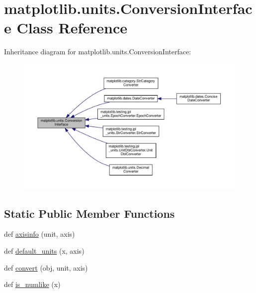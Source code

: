 \hypertarget{classmatplotlib_1_1units_1_1ConversionInterface}{}\section{matplotlib.\+units.\+Conversion\+Interface Class Reference}
\label{classmatplotlib_1_1units_1_1ConversionInterface}


Inheritance diagram for matplotlib.\+units.\+Conversion\+Interface\+:
\nopagebreak
\begin{figure}[H]
\begin{center}
\leavevmode
\includegraphics[width=350pt]{classmatplotlib_1_1units_1_1ConversionInterface__inherit__graph}
\end{center}
\end{figure}
\subsection*{Static Public Member Functions}
\begin{DoxyCompactItemize}
\item 
def \hyperlink{classmatplotlib_1_1units_1_1ConversionInterface_a9b4018c7837e3646e722747d8853b200}{axisinfo} (unit, axis)
\item 
def \hyperlink{classmatplotlib_1_1units_1_1ConversionInterface_ab979f9bc68cc2c125913a60a3f37061d}{default\+\_\+units} (x, axis)
\item 
def \hyperlink{classmatplotlib_1_1units_1_1ConversionInterface_ad7bfcbda9759240f1a1bca360c64ae18}{convert} (obj, unit, axis)
\item 
def \hyperlink{classmatplotlib_1_1units_1_1ConversionInterface_a236629416d3c8ebe029a45494fcef0bd}{is\+\_\+numlike} (x)
\end{DoxyCompactItemize}


